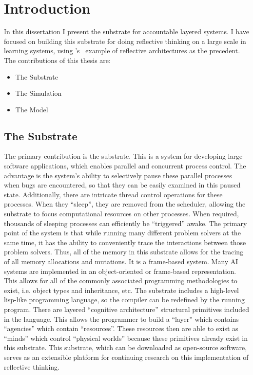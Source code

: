 \chapter{Introduction}
\label{chapter:introduction}

In this dissertation I present the substrate for accountable layered
systems.  I have focused on building this substrate for doing
reflective thinking on a large scale in learning systems, using
{\mbox{\citeauthor{singh:2005}'s~\citeyearpar{singh:2005}}} example of
reflective architectures as the precedent.  The contributions of this
thesis are:

\begin{itemize}
\item The Substrate
\item The Simulation
\item The Model
\end{itemize}
  
\section{The Substrate}

The primary contribution is the substrate.  This is a system for
developing large software applications, which enables parallel and
concurrent process control.  The advantage is the system's ability to
selectively pause these parallel processes when bugs are encountered,
so that they can be easily examined in this paused state.
Additionally, there are intricate thread control operations for these
processes.  When they ``sleep'', they are removed from the scheduler,
allowing the substrate to focus computational resources on other
processes.  When required, thousands of sleeping processes can
efficiently be ``triggered'' awake.  The primary point of the system
is that while running many different problem solvers at the same time,
it has the ability to conveniently trace the interactions between
those problem solvers.  Thus, all of the memory in this substrate
allows for the tracing of all memory allocations and mutations.  It is
a frame-based system.  Many AI systems are implemented in an
object-oriented or frame-based representation.  This allows for all of
the commonly associated programming methodologies to exist, i.e.
object types and inheritance, etc.  The substrate includes a
high-level lisp-like programming language, so the compiler can be
redefined by the running program.  There are layered ``cognitive
architecture'' structural primitives included in the language.  This
allows the programmer to build a ``layer'' which contains ``agencies''
which contain ``resources''.  These resources then are able to exist
as ``minds'' which control ``physical worlds'' because these
primitives already exist in this substrate.  This substrate, which can
be downloaded as open-source software, serves as an extensible
platform for continuing research on this implementation of reflective
thinking.

